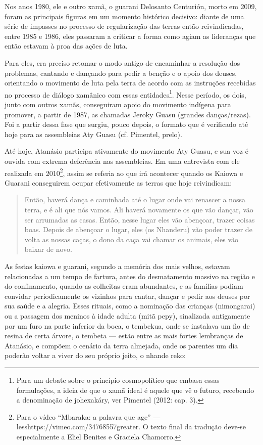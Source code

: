 Nos anos 1980, ele e outro xamã, o guarani Delosanto Centurión, morto em
2009, foram as principais figuras em um momento histórico decisivo:
diante de uma série de impasses no processo de regularização das terras
então reivindicadas, entre 1985 e 1986, eles passaram a criticar a
forma como agiam as lideranças que então estavam à proa das ações de
luta.

Para eles, era preciso retomar o modo antigo de encaminhar a resolução
dos problemas, cantando e dançando para pedir a benção e o apoio dos
deuses, orientando o movimento de luta pela terra de acordo com as
instruções recebidas no processo de diálogo xamânico com essas
entidades\footnote{Para um debate sobre o princípio cosmopolítico que
embasa essas formulações, a ideia de que o xamã ideal é aquele que vê o
futuro, recebendo a denominação de johexakáry, ver Pimentel (2012: cap.
3).}. Nesse período, os dois, junto com outros xamãs, conseguiram apoio
do movimento indígena para promover, a partir de 1987, as chamadas
Jeroky Guasu (grandes danças/rezas). Foi a partir dessa fase que
surgiu, pouco depois, o formato que é verificado até hoje para as
assembleias Aty Guasu (cf. Pimentel, prelo).

Até hoje, Atanásio participa ativamente do movimento Aty Guasu, e sua
voz é ouvida com extrema deferência nas assembleias. Em uma entrevista
com ele realizada em 2010\footnote{Para o vídeo ``Mbaraka: a palavra que
age'' — {less}https://vimeo.com/34768557{greater}. O texto
final da tradução deve-se especialmente a Eliel Benites e Graciela
Chamorro.}, assim se referia ao que irá acontecer quando os Kaiowa e
Guarani conseguirem ocupar efetivamente as terras que hoje reivindicam:

\begin{quotation}
Então, haverá dança e caminhada até o lugar onde vai renascer a nossa
terra, e é ali que nós vamos. Ali haverá novamente os que vão dançar,
vão ser arrumadas as casas. Então, nesse lugar eles vão abençoar,
trazer coisas boas. Depois de abençoar o lugar, eles (os Nhanderu) vão
poder trazer de volta as nossas caças, o dono da caça vai chamar os
animais, eles vão baixar de novo.
\end{quotation}

As festas kaiowa e guarani, segundo a memória dos mais velhos, estavam
relacionadas a um tempo de fartura, antes do desmatamento massivo na
região e do confinamento, quando as colheitas eram abundantes, e as
famílias podiam convidar periodicamente os vizinhos para cantar, dançar
e pedir aos deuses por sua saúde e a alegria. Esses rituais, como a
nominação das crianças (nimongarai) ou a passagem dos meninos à idade
adulta (mitã pepy), sinalizada antigamente por um furo na parte
inferior da boca, o tembekua, onde se instalava um fio de resina de
certa árvore, o tembeta — estão entre as mais fortes lembranças de
Atanásio, e compõem o cenário da terra almejada, onde os parentes um
dia poderão voltar a viver do seu próprio jeito, o nhande reko:

